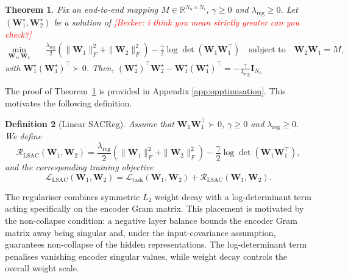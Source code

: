 \documentclass{article} %
\newcommand{\wa}{\mathbf{W}_1}
\newcommand{\wb}{\mathbf{W}_2}
\newtheorem{theorem}{Theorem}[section]
\newtheorem{definition}[theorem]{Definition}
\theoremstyle{remark}
\newcommand{\BD}[1]{\textcolor{red}{[Berker: #1]}}
\begin{document}
\begin{theorem}
\label{thm:encoder-variational-balance}
Fix an end-to-end mapping $
M\in\mathbb{R}^{N_o\times N_i}$, $\gamma \geq  0$ and $\lambda_{\mathrm{reg}} \geq  0$. Let $(\wa^\star,\wb^\star)$ be a solution of \BD{i think you mean strictly greater can you check?}
\begin{equation}
\begin{aligned}
\min_{\wa,\wb}\quad&
\frac{\lambda_{\mathrm{reg}}}{2}
\left(
    \|\wa\|_F^2+\|\wb\|_F^2
\right)
-
\frac{\gamma}{2}
\log\det\left(\wa\wa^\top\right)\quad \text{subject to}\quad
\wb\wa=M,
\end{aligned}
\label{eq:encoder-constrained-problem}
\end{equation}
with
\(\wa^\star(\wa^\star)^\top\succ0\). Then,  $(\wb^\star)^\top\wb^\star
-
\wa^\star(\wa^\star)^\top
=
-\frac{\gamma}{\lambda_{\mathrm{reg}}}
\mathbf{I}_{N_h}$
\end{theorem}
The proof of Theorem~\ref{thm:encoder-variational-balance} is provided in Appendix \ref{app:opptimisation}. This motivates the following definition.
\begin{definition}[Linear SACReg]
\label{def:linear-encoder-regulariser}
Assume that $\wa\wa^\top\succ0$, $\gamma \geq  0$ and $\lambda_{\mathrm{reg}} \geq  0$. We define
\[
\mathcal{R}_{\mathrm{LSAC}}(\wa,\wb)
=
\frac{\lambda_{\mathrm{reg}}}{2}
\left(
    \|\wa\|_F^2+\|\wb\|_F^2
\right)
-
\frac{\gamma}{2}
\log\det\left(\wa\wa^\top\right),
\]
and the
corresponding training objective  $$\mathcal{L}_{\mathrm{LSAC}}(\wa,\wb)
=
\mathcal{L}_{\mathrm{task}}(\wa,\wb)
+
\mathcal{R}_{\mathrm{LSAC}}(\wa,\wb).
\label{eq:encoder-regularised-objective}$$
\end{definition}
The regulariser combines symmetric $L_2$ weight decay with a
log-determinant term acting specifically on the encoder Gram matrix. 
This placement is motivated by the non-collapse condition:
a negative layer balance bounds the encoder Gram matrix away being singular and, under the input-covariance assumption, guarantees
non-collapse of the hidden representations. The log-determinant term
penalises vanishing encoder singular values, while weight decay controls the overall weight scale.
\end{document}
